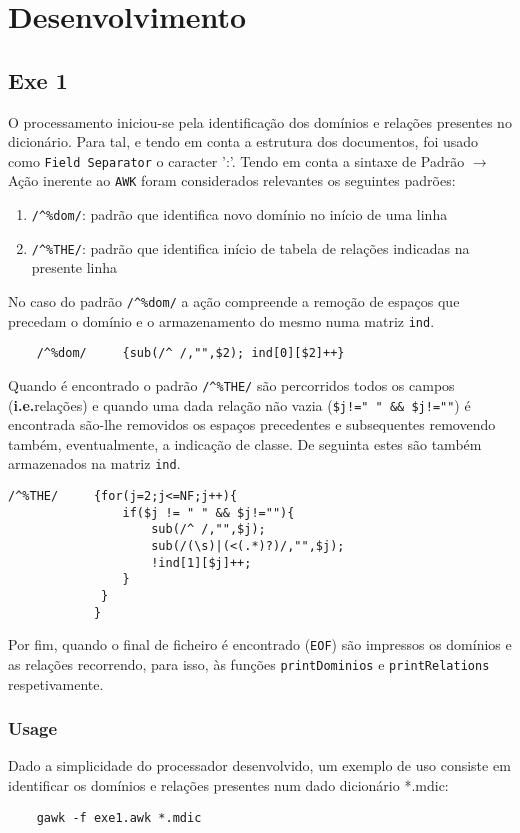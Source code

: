 \documentclass{llncs}
\begin{document}
\section{Desenvolvimento}
\subsection{Exe 1}
O processamento iniciou-se pela identificação dos domínios e relações presentes no dicionário. Para tal, e tendo em conta a estrutura dos documentos, foi usado como \texttt{Field Separator} o caracter ':'.
Tendo em conta a sintaxe de Padrão $\to$ Ação inerente ao \texttt{AWK} foram considerados relevantes os seguintes padrões:
\begin{enumerate}
    \item \verb|/^%dom/|: padrão que identifica novo domínio no início de uma linha
    \item \verb|/^%THE/|: padrão que identifica início de tabela de relações indicadas na presente linha
\end{enumerate}
No caso do padrão \verb|/^%dom/| a ação compreende a remoção de espaços que precedam o domínio e o armazenamento do mesmo numa matriz \texttt{ind}.
\begin{Verbatim}
    /^%dom/     {sub(/^ /,"",$2); ind[0][$2]++}
\end{Verbatim}
Quando é encontrado o padrão \verb|/^%THE/| são percorridos todos os campos (\textbf{i.e.}relações) e quando uma dada relação não vazia (\verb|$j!=" " && $j!=""|) é encontrada são-lhe removidos os espaços precedentes e subsequentes removendo também, eventualmente, a indicação de classe. De seguinta estes são também armazenados na matriz \texttt{ind}.
\begin{Verbatim}
/^%THE/     {for(j=2;j<=NF;j++){
                if($j != " " && $j!=""){
                    sub(/^ /,"",$j);           
                    sub(/(\s)|(<(.*)?)/,"",$j);
                    !ind[1][$j]++;
                }                              
             }
            }

\end{Verbatim}

Por fim, quando o final de ficheiro é encontrado (\texttt{EOF}) são impressos os domínios e as relações recorrendo, para isso, às funções \texttt{printDominios} e \texttt{printRelations} respetivamente.

\subsubsection{Usage}
Dado a simplicidade do processador desenvolvido, um exemplo de uso consiste em identificar os domínios e relações presentes num dado dicionário *.mdic:
\begin{Verbatim}
    gawk -f exe1.awk *.mdic
\end{Verbatim}
\end{document}
